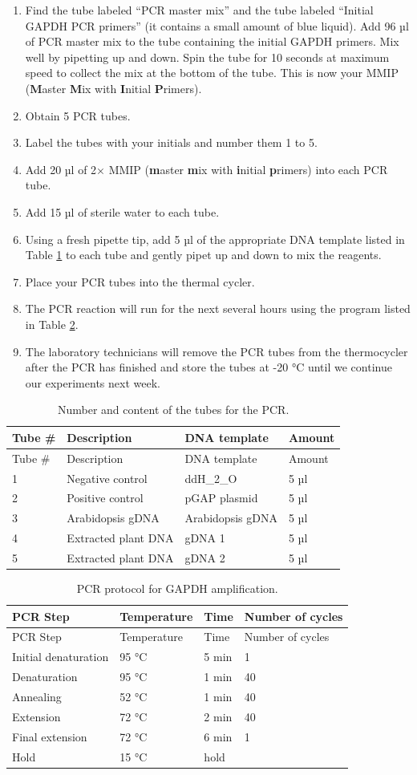 \documentclass[]{book}
\providecommand{\tightlist}{%
  \setlength{\itemsep}{0pt}\setlength{\parskip}{0pt}}
\begin{document}
\begin{enumerate}
\def\labelenumi{\arabic{enumi}.}
\tightlist
\item
  Find the tube labeled ``PCR master mix'' and the tube labeled ``Initial GAPDH PCR primers'' (it contains a small amount of blue liquid). Add 96 µl of PCR master mix to the tube containing the initial GAPDH primers. Mix well by pipetting up and down. Spin the tube for 10 seconds at maximum speed to collect the mix at the bottom of the tube. This is now your MMIP (\textbf{M}aster \textbf{M}ix with \textbf{I}nitial \textbf{P}rimers).
\item
  Obtain 5 PCR tubes.
\item
  Label the tubes with your initials and number them 1 to 5.
\item
  Add 20 µl of 2× MMIP (\textbf{m}aster \textbf{m}ix with \textbf{i}nitial \textbf{p}rimers) into each PCR tube.
\item
  Add 15 µl of sterile water to each tube.
\item
  Using a fresh pipette tip, add 5 µl of the appropriate DNA template listed in Table \ref{tab:tubes} to each tube and gently pipet up and down to mix the reagents.
\item
  Place your PCR tubes into the thermal cycler.
\item
  The PCR reaction will run for the next several hours using the program listed in Table \ref{tab:pcr}.
\item
  The laboratory technicians will remove the PCR tubes from the thermocycler after the PCR has finished and store the tubes at -20 °C until we continue our experiments next week.
\end{enumerate}

\begin{longtable}[]{@{}llll@{}}
\caption{\label{tab:tubes} Number and content of the tubes for the PCR.}\tabularnewline
\toprule
Tube \# & Description & DNA template & Amount\tabularnewline
\midrule
\endfirsthead
\toprule
Tube \# & Description & DNA template & Amount\tabularnewline
\midrule
\endhead
1 & Negative control & ddH\_2\_O & 5 µl\tabularnewline
2 & Positive control & pGAP plasmid & 5 µl\tabularnewline
3 & Arabidopsis gDNA & Arabidopsis gDNA & 5 µl\tabularnewline
4 & Extracted plant DNA & gDNA 1 & 5 µl\tabularnewline
5 & Extracted plant DNA & gDNA 2 & 5 µl\tabularnewline
\bottomrule
\end{longtable}

\begin{longtable}[]{@{}llll@{}}
\caption{\label{tab:pcr} PCR protocol for GAPDH amplification.}\tabularnewline
\toprule
PCR Step & Temperature & Time & Number of cycles\tabularnewline
\midrule
\endfirsthead
\toprule
PCR Step & Temperature & Time & Number of cycles\tabularnewline
\midrule
\endhead
Initial denaturation & 95 °C & 5 min & 1\tabularnewline
Denaturation & 95 °C & 1 min & 40\tabularnewline
Annealing & 52 °C & 1 min & 40\tabularnewline
Extension & 72 °C & 2 min & 40\tabularnewline
Final extension & 72 °C & 6 min & 1\tabularnewline
Hold & 15 °C & hold &\tabularnewline
\bottomrule
\end{longtable}
\end{document}
